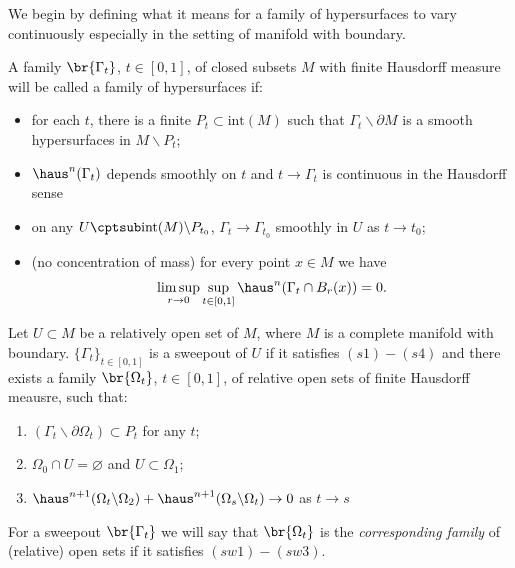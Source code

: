We begin by defining what it means for a family of hypersurfaces to vary continuously especially in the setting of manifold with boundary. 
\begin{definition}\label{def:family-surfaces}
A family $\br{\Gamma_t}$, $t \in [0, 1]$, of closed subsets $M$ with finite Hausdorff measure will be called a family of hypersurfaces if:
\begin{itemize}
    \item[(s1)] for each $t$, there is a finite $P_t \subset \text{int}(M)$ such that $\Gamma_t\backslash \partial M$ is a smooth hypersurfaces in $M \backslash P_t$;
    \item[(s2)] $\haus^n(\Gamma_t)$ depends smoothly on $t$ and $t \to \Gamma_t$ is continuous in the Hausdorff sense 
    \item[(s3)] on any $U \cptsub \text{int}(M)\backslash P_{t_0}$, $\Gamma_t\to\Gamma_{t_0}$ smoothly in $U$ as $t \to t_0$;
    \item[(s4)] (no concentration of mass) for every point $x \in M$ we have 
    \begin{equation*}
        \limsup_{r \to 0}\sup_{t \in [0, 1]}\haus^n(\Gamma_t\cap B_r(x)) = 0.
    \end{equation*}
\end{itemize}
\end{definition}
\begin{definition}\label{def:sweepout}
Let $U \subset M$ be a relatively open set of $M$, where $M$ is a complete manifold with boundary. $\{\Gamma_t\}_{t \in [0,1]}$ is a sweepout of $U$ if it satisfies $(s1)-(s4)$ and there exists a family $\br{\Omega_t}$, $t \in [0, 1]$, of relative open sets of finite Hausdorff meausre, such that:
\begin{enumerate}
    \item[(sw1)] $(\Gamma_t \backslash\partial\Omega_t) \subset P_t$ for any $t$;
    \item[(sw2)] $\Omega_0\cap U = \varnothing$ and $U \subset \Omega_1$;
    \item[(sw3)] $\haus^{n + 1}(\Omega_t\backslash \Omega_2) + \haus^{n + 1}(\Omega_s\backslash\Omega_t) \to 0$ as $t \to s$
\end{enumerate}
For a sweepout $\br{\Gamma_t}$ we will say that $\br{\Omega_t}$ is the \emph{corresponding family} of (relative) open sets if it satisfies $(sw1)-(sw3)$.
\end{definition}

